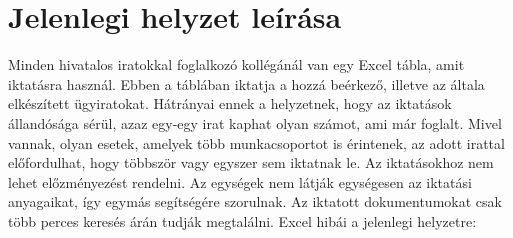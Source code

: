 \documentclass[
]{thesis-ekf}
\theoremstyle{definition}
\theoremstyle{remark}
\begin{document}
\section{Jelenlegi helyzet leírása}
Minden hivatalos iratokkal foglalkozó kollégánál van egy Excel tábla, amit iktatásra használ. Ebben a táblában iktatja a hozzá beérkező, illetve az általa elkészített ügyiratokat. Hátrányai ennek a helyzetnek, hogy az iktatások állandósága sérül, azaz egy-egy irat kaphat olyan számot, ami már foglalt. Mivel vannak, olyan esetek, amelyek több munkacsoportot is érintenek, az adott irattal előfordulhat, hogy többször vagy egyszer sem iktatnak le. Az iktatásokhoz nem lehet előzményezést rendelni. Az egységek nem látják egységesen az iktatási anyagaikat, így egymás segítségére szorulnak. Az iktatott dokumentumokat csak több perces keresés árán tudják megtalálni. 
Excel hibái a jelenlegi helyzetre:
\end{document}
